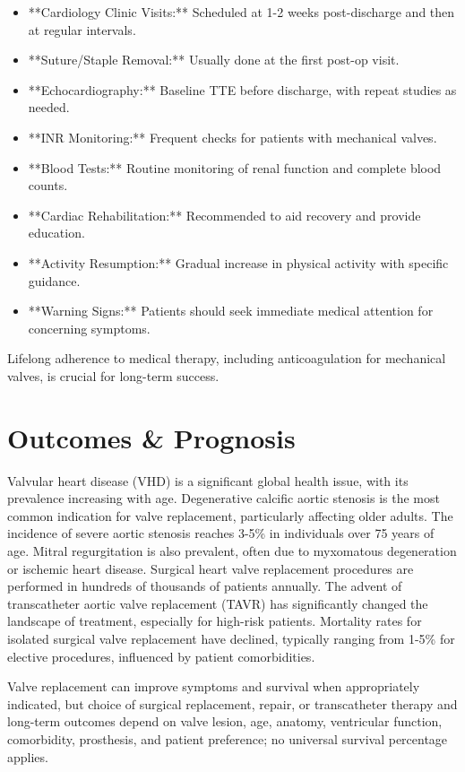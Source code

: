 \begin{itemize}
  \item **Cardiology Clinic Visits:** Scheduled at 1-2 weeks post-discharge and then at regular intervals.
  \item **Suture/Staple Removal:** Usually done at the first post-op visit.
  \item **Echocardiography:** Baseline TTE before discharge, with repeat studies as needed.
  \item **INR Monitoring:** Frequent checks for patients with mechanical valves.
  \item **Blood Tests:** Routine monitoring of renal function and complete blood counts.
  \item **Cardiac Rehabilitation:** Recommended to aid recovery and provide education.
  \item **Activity Resumption:** Gradual increase in physical activity with specific guidance.
  \item **Warning Signs:** Patients should seek immediate medical attention for concerning symptoms.
\end{itemize}

Lifelong adherence to medical therapy, including anticoagulation for mechanical valves, is crucial for long-term success.

\section*{Outcomes \& Prognosis}
Valvular heart disease (VHD) is a significant global health issue, with its prevalence increasing with age. Degenerative calcific aortic stenosis is the most common indication for valve replacement, particularly affecting older adults. The incidence of severe aortic stenosis reaches 3-5\% in individuals over 75 years of age. Mitral regurgitation is also prevalent, often due to myxomatous degeneration or ischemic heart disease. Surgical heart valve replacement procedures are performed in hundreds of thousands of patients annually. The advent of transcatheter aortic valve replacement (TAVR) has significantly changed the landscape of treatment, especially for high-risk patients. Mortality rates for isolated surgical valve replacement have declined, typically ranging from 1-5\% for elective procedures, influenced by patient comorbidities.

Valve replacement can improve symptoms and survival when appropriately indicated, but choice of surgical replacement, repair, or transcatheter therapy and long-term outcomes depend on valve lesion, age, anatomy, ventricular function, comorbidity, prosthesis, and patient preference; no universal survival percentage applies.

